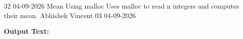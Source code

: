 \clearpage
\label{prog:32}
\programhead
  {32}
  {04-09-2026}
  {Mean Using malloc}
  {Uses malloc to read n integers and computes their mean.}
  {Abhishek Vincent}
  {03}
  {04-09-2026}

\divider
\textbf{Output Text:}\par
\vspace{2pt}

